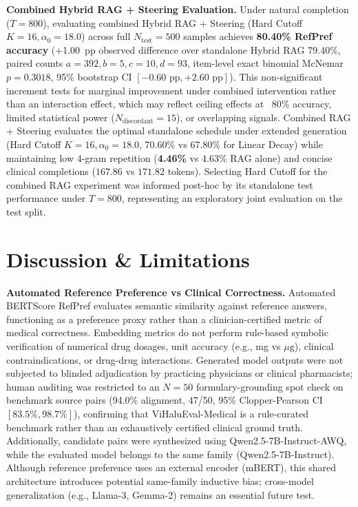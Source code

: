 \documentclass[runningheads]{llncs}
\begin{document}
\textbf{Combined Hybrid RAG + Steering Evaluation.} Under natural completion ($T=800$), evaluating combined Hybrid RAG + Steering (Hard Cutoff $K=16, \alpha_0=18.0$) across full $N_{\text{test}}=500$ samples achieves \textbf{80.40\% RefPref accuracy} (+1.00~pp observed difference over standalone Hybrid RAG 79.40\%, paired counts $a=392, b=5, c=10, d=93$, item-level exact binomial McNemar $p=0.3018$, 95\% bootstrap CI $[-0.60\text{ pp}, +2.60\text{ pp}]$). This non-significant increment tests for marginal improvement under combined intervention rather than an interaction effect, which may reflect ceiling effects at ~80\% accuracy, limited statistical power ($N_{\text{discordant}}=15$), or overlapping signals. Combined RAG + Steering evaluates the optimal standalone schedule under extended generation (Hard Cutoff $K=16, \alpha_0=18.0$, 70.60\% vs 67.80\% for Linear Decay) while maintaining low 4-gram repetition (\textbf{4.46\%} vs 4.63\% RAG alone) and concise clinical completions ($167.86$ vs $171.82$ tokens). Selecting Hard Cutoff for the combined RAG experiment was informed post-hoc by its standalone test performance under $T=800$, representing an exploratory joint evaluation on the test split.

\section{Discussion \& Limitations}\label{sec:discussion}
\textbf{Automated Reference Preference vs Clinical Correctness.} Automated BERTScore RefPref evaluates semantic similarity against reference answers, functioning as a preference proxy rather than a clinician-certified metric of medical correctness. Embedding metrics do not perform rule-based symbolic verification of numerical drug dosages, unit accuracy (e.g., mg vs $\mu\text{g}$), clinical contraindications, or drug-drug interactions. Generated model outputs were not subjected to blinded adjudication by practicing physicians or clinical pharmacists; human auditing was restricted to an $N=50$ formulary-grounding spot check on benchmark source pairs (94.0\% alignment, 47/50, 95\% Clopper-Pearson CI $[83.5\%, 98.7\%]$), confirming that ViHaluEval-Medical is a rule-curated benchmark rather than an exhaustively certified clinical ground truth. Additionally, candidate pairs were synthesized using Qwen2.5-7B-Instruct-AWQ, while the evaluated model belongs to the same family (Qwen2.5-7B-Instruct). Although reference preference uses an external encoder (mBERT), this shared architecture introduces potential same-family inductive bias; cross-model generalization (e.g., Llama-3, Gemma-2) remains an essential future test.
\end{document}
